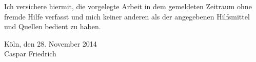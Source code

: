 \documentclass[thesis.tex]{subfiles}
\begin{document}

\noindent Ich versichere hiermit, die vorgelegte Arbeit in dem gemeldeten Zeitraum ohne fremde Hilfe verfasst und mich keiner anderen als der angegebenen Hilfsmittel und Quellen bedient zu haben.

\vfill

\noindent Köln, den 28. November 2014\\[1cm]

\noindent Caspar Friedrich
\end{document}
